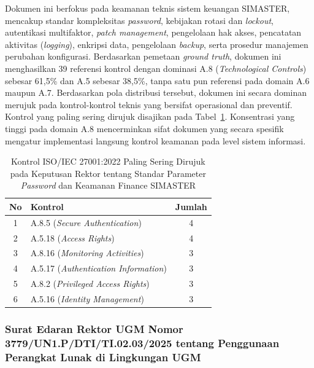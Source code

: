 Dokumen ini berfokus pada keamanan teknis sistem keuangan SIMASTER, mencakup standar kompleksitas \textit{password}, kebijakan rotasi dan \textit{lockout}, autentikasi multifaktor, \textit{patch management}, pengelolaan hak akses, pencatatan aktivitas (\textit{logging}), enkripsi data, pengelolaan \textit{backup}, serta prosedur manajemen perubahan konfigurasi. Berdasarkan pemetaan \textit{ground truth}, dokumen ini menghasilkan 39 referensi kontrol dengan dominasi A.8 (\textit{Technological Controls}) sebesar 61,5\% dan A.5 sebesar 38,5\%, tanpa satu pun referensi pada domain A.6 maupun A.7. Berdasarkan pola distribusi tersebut, dokumen ini secara dominan merujuk pada kontrol-kontrol teknis yang bersifat operasional dan preventif. Kontrol yang paling sering dirujuk disajikan pada Tabel~\ref{tbl:top_ctrl_password}. Konsentrasi yang tinggi pada domain A.8 mencerminkan sifat dokumen yang secara spesifik mengatur implementasi langsung kontrol keamanan pada level sistem informasi.

\begin{table}[H]
	\centering
	\caption{Kontrol ISO/IEC 27001:2022 Paling Sering Dirujuk pada Keputusan Rektor tentang Standar Parameter \textit{Password} dan Keamanan Finance SIMASTER}
	\label{tbl:top_ctrl_password}
	\small
	\begin{tabular}{|c|>{\raggedright\arraybackslash}p{8.5cm}|c|}
		\hline
		\textbf{No} & \textbf{Kontrol} & \textbf{Jumlah} \\
		\hline
		1 & A.8.5 (\textit{Secure Authentication}) & 4 \\
		\hline
		2 & A.5.18 (\textit{Access Rights}) & 4 \\
		\hline
		3 & A.8.16 (\textit{Monitoring Activities}) & 3 \\
		\hline
		4 & A.5.17 (\textit{Authentication Information}) & 3 \\
		\hline
		5 & A.8.2 (\textit{Privileged Access Rights}) & 3 \\
		\hline
		6 & A.5.16 (\textit{Identity Management}) & 3 \\
		\hline
	\end{tabular}
\end{table}

\subsubsection{Surat Edaran Rektor UGM Nomor 3779/UN1.P/DTI/TI.02.03/2025 tentang Penggunaan Perangkat Lunak di Lingkungan UGM}

